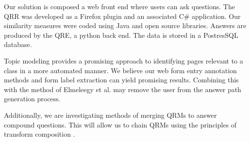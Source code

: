 Our solution is composed a web front end where users can ask questions. The QRR was developed as a Firefox plugin and an associated C\# application.  Our similarity measures were coded using Java and open source libraries. Answers are produced by the QRE, a python back end. The data is stored in a PostresSQL database.


Topic modeling provides a promising approach to identifying pages relevant to a class in a more automated manner. We believe our web form entry annotation methods and form label extraction \cite{1453931} can yield promising results. Combining this with the method of Elmeleegy et al. \cite{1687749} may remove the user from the answer path generation process.

Additionally, we are investigating methods of merging QRMs to answer compound questions.  This will allow us to chain QRMs using the principles of transform composition \cite{transformscout}.


